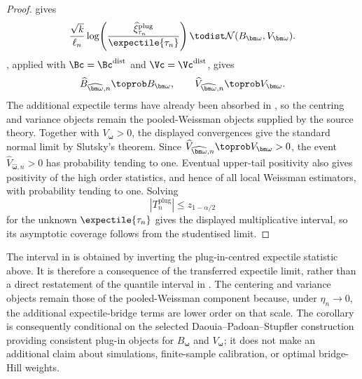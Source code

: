 \begin{proof}
 gives
\[
  \frac{\sqrt{k}}{\ell_n}
  \log\!\left(
    \frac{\widehat\xi_{\tau_n}^{\mathrm{plug}}}{\expectile{\tau_n}}
  \right)
  \todist
  \mathcal N(B_{\bm\omega},V_{\bm\omega}).
\]
, applied with
\(\Bc=\Bc^{\mathrm{dist}}\) and \(\Vc=\Vc^{\mathrm{dist}}\), gives
\[
  \widehat B_{\widehat{\bm\omega},n}\toprob B_{\bm\omega},
  \qquad
  \widehat V_{\widehat{\bm\omega},n}\toprob V_{\bm\omega}.
\]
The additional expectile terms have already been absorbed in
, so the centring and variance objects remain
the pooled-Weissman objects supplied by the source theory. Together with
\(V_{\bm\omega}>0\), the displayed convergences give the standard normal limit
by Slutsky's theorem.
Since \(\widehat V_{\widehat{\bm\omega},n}\toprob V_{\bm\omega}>0\), the event
\(\widehat V_{\widehat{\bm\omega},n}>0\) has probability tending to one.
Eventual upper-tail positivity also gives positivity of the high order
statistics, and hence of all local Weissman estimators, with probability
tending to one.
Solving
\[
  \left|T_n^{\mathrm{plug}}\right|\le z_{1-\alpha/2}
\]
for the unknown \(\expectile{\tau_n}\) gives the displayed multiplicative
interval, so its asymptotic coverage follows from the studentised limit.
\end{proof}

\begin{remark}
\label{rem:pool-ext:interval-scope}
The interval in  is obtained by inverting
the plug-in-centred expectile statistic above. It is therefore a consequence
of the transferred expectile limit, rather than a direct restatement of the
quantile interval in \textcite{DaouiaPadoanStupfler2021}. The centering and
variance objects remain those of the pooled-Weissman component because, under
\(\eta_n\to0\), the additional expectile-bridge terms are lower order on that
scale. The corollary is consequently conditional on the selected
Daouia--Padoan--Stupfler construction providing consistent plug-in objects for
\(B_{\bm\omega}\) and \(V_{\bm\omega}\); it does not make an additional claim
about simulations, finite-sample calibration, or optimal bridge-Hill weights.
\end{remark}
